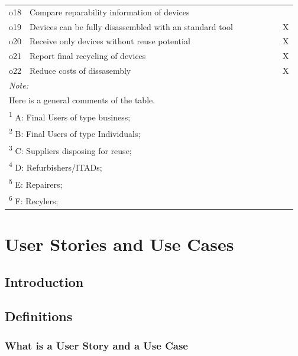 \documentclass[
]{book}
\begin{document}
\begin{table}
{\begin{tabular}[t]{llllllll}
o18 & Compare reparability information of devices &  &  &  &  &  & \\
o19 & Devices can be fully disassembled with an standard tool &  &  &  &  &  & X\\
o20 & Receive only devices without reuse potential &  &  &  &  &  & X\\
o21 & Report final recycling of devices &  &  &  &  &  & X\\
o22 & Reduce costs of dissasembly &  &  &  &  &  & X\\
\bottomrule
\multicolumn{8}{l}{\rule{0pt}{1em}\textit{Note: }}\\
\multicolumn{8}{l}{\rule{0pt}{1em}Here is a general comments of the table. }\\
\multicolumn{8}{l}{\rule{0pt}{1em}\textsuperscript{1} A: Final Users of type business; }\\
\multicolumn{8}{l}{\rule{0pt}{1em}\textsuperscript{2} B: Final Users of type Individuals; }\\
\multicolumn{8}{l}{\rule{0pt}{1em}\textsuperscript{3} C: Suppliers disposing for reuse; }\\
\multicolumn{8}{l}{\rule{0pt}{1em}\textsuperscript{4} D: Refurbishers/ITADs; }\\
\multicolumn{8}{l}{\rule{0pt}{1em}\textsuperscript{5} E: Repairers; }\\
\multicolumn{8}{l}{\rule{0pt}{1em}\textsuperscript{6} F: Recylers; }\\
\end{tabular}}
\end{table}

\hypertarget{user-stories-and-use-cases}{%
\chapter{User Stories and Use Cases}\label{user-stories-and-use-cases}}

\hypertarget{introduction-1}{%
\section{Introduction}\label{introduction-1}}

\hypertarget{definitions}{%
\section{Definitions}\label{definitions}}

\hypertarget{what-is-a-user-story-and-a-use-case}{%
\subsection{What is a User Story and a Use Case}\label{what-is-a-user-story-and-a-use-case}}
\end{document}

